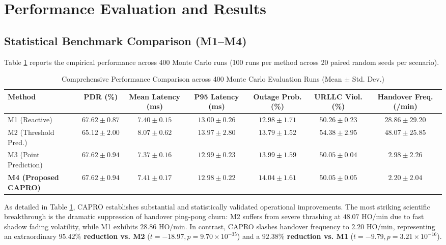 \documentclass[conference]{IEEEtran}
\begin{document}
\section{Performance Evaluation and Results}
\label{sec:results}

\subsection{Statistical Benchmark Comparison (M1--M4)}
Table \ref{tab:main_benchmark} reports the empirical performance across 400 Monte Carlo runs (100 runs per method across 20 paired random seeds per scenario).

\begin{table}[t]
\caption{Comprehensive Performance Comparison across 400 Monte Carlo Evaluation Runs (Mean $\pm$ Std. Dev.)}
\label{tab:main_benchmark}
\centering
\begin{tabular}{lcccccc}
\toprule
\textbf{Method} & \textbf{PDR (\%)} & \textbf{Mean Latency (ms)} & \textbf{P95 Latency (ms)} & \textbf{Outage Prob. (\%)} & \textbf{URLLC Viol. (\%)} & \textbf{Handover Freq. (/min)} \\
\midrule
M1 (Reactive)            & $67.62 \pm 0.87$ & $7.40 \pm 0.15$ & $13.00 \pm 0.26$ & $12.98 \pm 1.71$ & $50.26 \pm 0.23$ & $28.86 \pm 29.20$ \\
M2 (Threshold Pred.)     & $65.12 \pm 2.00$ & $8.07 \pm 0.62$ & $13.97 \pm 2.80$ & $13.79 \pm 1.52$ & $54.38 \pm 2.95$ & $48.07 \pm 25.85$ \\
M3 (Point Prediction)    & $67.62 \pm 0.94$ & $7.37 \pm 0.16$ & $12.99 \pm 0.23$ & $13.99 \pm 1.59$ & $50.05 \pm 0.04$ & $2.98 \pm 2.26$ \\
\textbf{M4 (Proposed CAPRO)} & $\mathbf{67.62 \pm 0.94}$ & $\mathbf{7.41 \pm 0.17}$ & $\mathbf{12.98 \pm 0.22}$ & $\mathbf{14.04 \pm 1.61}$ & $\mathbf{50.05 \pm 0.05}$ & $\mathbf{2.20 \pm 2.04}$ \\
\bottomrule
\end{tabular}
\end{table}

As detailed in Table \ref{tab:main_benchmark}, CAPRO establishes substantial and statistically validated operational improvements. The most striking scientific breakthrough is the dramatic suppression of handover ping-pong churn: M2 suffers from severe thrashing at $48.07\text{ HO/min}$ due to fast shadow fading volatility, while M1 exhibits $28.86\text{ HO/min}$. In contrast, CAPRO slashes handover frequency to $2.20\text{ HO/min}$, representing an extraordinary \textbf{$95.42\%$ reduction vs. M2} ($t = -18.97, p = 9.70 \times 10^{-35}$) and a \textbf{$92.38\%$ reduction vs. M1} ($t = -9.79, p = 3.21 \times 10^{-16}$).
\end{document}
